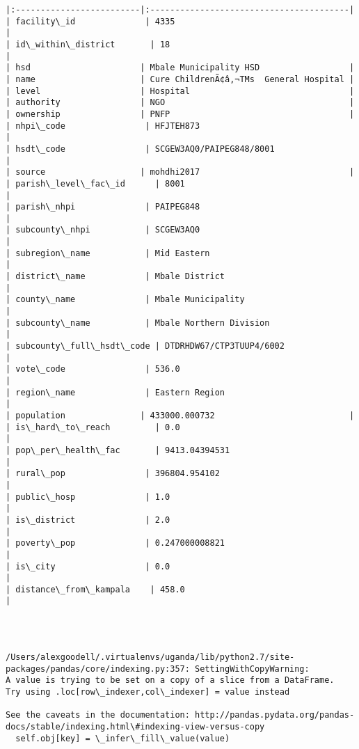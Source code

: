 \documentclass[11pt]{article}
\begin{document}
\begin{Verbatim}[commandchars=\\\{\}]
|:-------------------------|:----------------------------------------|
| facility\_id              | 4335                                    |
| id\_within\_district       | 18                                      |
| hsd                      | Mbale Municipality HSD                  |
| name                     | Cure ChildrenÃ¢â‚¬TMs  General Hospital |
| level                    | Hospital                                |
| authority                | NGO                                     |
| ownership                | PNFP                                    |
| nhpi\_code                | HFJTEH873                               |
| hsdt\_code                | SCGEW3AQ0/PAIPEG848/8001                |
| source                   | mohdhi2017                              |
| parish\_level\_fac\_id      | 8001                                    |
| parish\_nhpi              | PAIPEG848                               |
| subcounty\_nhpi           | SCGEW3AQ0                               |
| subregion\_name           | Mid Eastern                             |
| district\_name            | Mbale District                          |
| county\_name              | Mbale Municipality                      |
| subcounty\_name           | Mbale Northern Division                 |
| subcounty\_full\_hsdt\_code | DTDRHDW67/CTP3TUUP4/6002                |
| vote\_code                | 536.0                                   |
| region\_name              | Eastern Region                          |
| population               | 433000.000732                           |
| is\_hard\_to\_reach         | 0.0                                     |
| pop\_per\_health\_fac       | 9413.04394531                           |
| rural\_pop                | 396804.954102                           |
| public\_hosp              | 1.0                                     |
| is\_district              | 2.0                                     |
| poverty\_pop              | 0.247000008821                          |
| is\_city                  | 0.0                                     |
| distance\_from\_kampala    | 458.0                                   |




    \end{Verbatim}

    \begin{Verbatim}[commandchars=\\\{\}]
/Users/alexgoodell/.virtualenvs/uganda/lib/python2.7/site-packages/pandas/core/indexing.py:357: SettingWithCopyWarning: 
A value is trying to be set on a copy of a slice from a DataFrame.
Try using .loc[row\_indexer,col\_indexer] = value instead

See the caveats in the documentation: http://pandas.pydata.org/pandas-docs/stable/indexing.html\#indexing-view-versus-copy
  self.obj[key] = \_infer\_fill\_value(value)

    \end{Verbatim}
\end{document}
